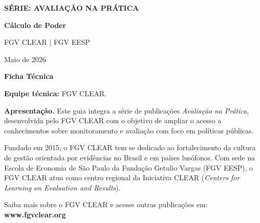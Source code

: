 \documentclass[12pt, a4paper, openany]{book}
\numberwithin{equation}{chapter}
\numberwithin{table}{chapter}
\numberwithin{figure}{chapter}
\begin{document}
\frontmatter

\thispagestyle{empty}
\begin{center}
\vspace*{3cm}

{\Large\bfseries\color{clearlightblue} S\'ERIE: AVALIA\c{C}\~AO NA PR\'ATICA}

\vspace{1.8cm}

{\Huge\bfseries\color{clearblue} C\'alculo de Poder }

\vspace{2.2cm}

{\large FGV CLEAR $|$ FGV EESP}

\vspace{0.5cm}

{\large Maio de 2026}

\vfill
\end{center}
\newpage

\thispagestyle{empty}
\vspace*{1.5cm}

{\Large\bfseries\color{clearblue} Ficha T\'ecnica}

\bigskip

\noindent\textbf{Equipe t\'ecnica:} FGV CLEAR.

\bigskip

\noindent\textbf{Apresenta\c{c}\~ao.} Este guia integra a s\'erie de publica\c{c}\~oes \textit{Avalia\c{c}\~ao na Pr\'atica}, desenvolvida pelo FGV CLEAR com o objetivo de ampliar o acesso a conhecimentos sobre monitoramento e avalia\c{c}\~ao com foco em pol\'iticas p\'ublicas.

\medskip

\noindent Fundado em 2015, o FGV CLEAR tem se dedicado ao fortalecimento da cultura de gest\~ao orientada por evid\^encias no Brasil e em pa\'ises lus\'ofonos. Com sede na Escola de Economia de S\~ao Paulo da Funda\c{c}\~ao Getulio Vargas (FGV EESP), o FGV CLEAR atua como centro regional da Iniciativa CLEAR (\textit{Centers for Learning on Evaluation and Results}).

\medskip

\noindent Saiba mais sobre o FGV CLEAR e acesse outras publica\c{c}\~oes em: \textbf{www.fgvclear.org}
\end{document}
